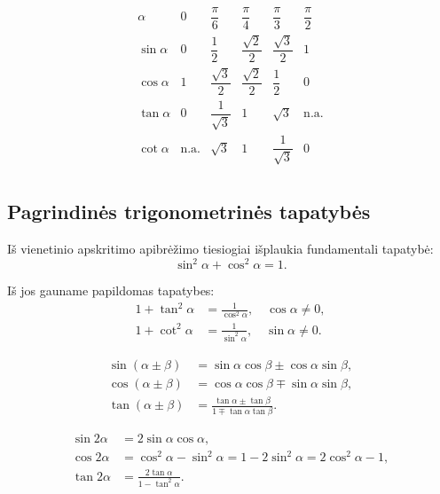 \begin{tcolorbox}[title=Ypatingų kampų reikšmių lentelė]
\[
\begin{array}{c|c|c|c|c|c}
\alpha & 0 & \dfrac{\pi}{6} & \dfrac{\pi}{4} & \dfrac{\pi}{3} & \dfrac{\pi}{2} \\[8pt]
\hline
\sin\alpha & 0 & \dfrac{1}{2} & \dfrac{\sqrt{2}}{2} & \dfrac{\sqrt{3}}{2} & 1 \\[8pt]
\hline
\cos\alpha & 1 & \dfrac{\sqrt{3}}{2} & \dfrac{\sqrt{2}}{2} & \dfrac{1}{2} & 0 \\[8pt]
\hline
\tan\alpha & 0 & \dfrac{1}{\sqrt{3}} & 1 & \sqrt{3} & \text{n.a.} \\[8pt]
\hline
\cot\alpha & \text{n.a.} & \sqrt{3} & 1 & \dfrac{1}{\sqrt{3}} & 0 \\[8pt]
\end{array}
\]
\end{tcolorbox}

\subsection{Pagrindinės trigonometrinės tapatybės}

Iš vienetinio apskritimo apibrėžimo tiesiogiai išplaukia fundamentali tapatybė:
\[
\sin^2\alpha + \cos^2\alpha = 1.
\]

Iš jos gauname papildomas tapatybes:
\begin{align}
1 + \tan^2\alpha &= \frac{1}{\cos^2\alpha}, \quad \cos\alpha \neq 0, \\[4pt]
1 + \cot^2\alpha &= \frac{1}{\sin^2\alpha}, \quad \sin\alpha \neq 0.
\end{align}

\begin{tcolorbox}[title=Sumos ir skirtumo formulės]
\begin{align*}
\sin(\alpha \pm \beta) &= \sin\alpha\cos\beta \pm \cos\alpha\sin\beta,\\
\cos(\alpha \pm \beta) &= \cos\alpha\cos\beta \mp \sin\alpha\sin\beta,\\
\tan(\alpha \pm \beta) &= \frac{\tan\alpha \pm \tan\beta}{1 \mp \tan\alpha\tan\beta}.
\end{align*}
\end{tcolorbox}

\begin{tcolorbox}[title=Dvigubo kampo formulės]
\begin{align*}
\sin 2\alpha &= 2\sin\alpha\cos\alpha,\\
\cos 2\alpha &= \cos^2\alpha - \sin^2\alpha = 1 - 2\sin^2\alpha = 2\cos^2\alpha - 1,\\
\tan 2\alpha &= \frac{2\tan\alpha}{1 - \tan^2\alpha}.
\end{align*}
\end{tcolorbox}

